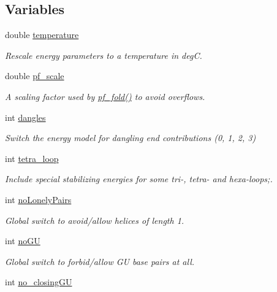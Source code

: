 \subsection*{Variables}
\begin{DoxyCompactItemize}
\item 
double \hyperlink{group__model__details_gab4b11c8d9c758430960896bc3fe82ead}{temperature}
\begin{DoxyCompactList}\small\item\em Rescale energy parameters to a temperature in degC. \end{DoxyCompactList}\item 
double \hyperlink{group__model__details_gad3b22044065acc6dee0af68931b52cfd}{pf\+\_\+scale}
\begin{DoxyCompactList}\small\item\em A scaling factor used by \hyperlink{group__pf__fold_gadc3db3d98742427e7001a7fd36ef28c2}{pf\+\_\+fold()} to avoid overflows. \end{DoxyCompactList}\item 
int \hyperlink{group__model__details_ga72b511ed1201f7e23ec437e468790d74}{dangles}
\begin{DoxyCompactList}\small\item\em Switch the energy model for dangling end contributions (0, 1, 2, 3) \end{DoxyCompactList}\item 
int \hyperlink{group__model__details_ga4f6265bdf0ead7ff4628a360adbfd77e}{tetra\+\_\+loop}
\begin{DoxyCompactList}\small\item\em Include special stabilizing energies for some tri-\/, tetra-\/ and hexa-\/loops;. \end{DoxyCompactList}\item 
int \hyperlink{group__model__details_ga097eccaabd6ae8b4fef83cccff85bb5d}{no\+Lonely\+Pairs}
\begin{DoxyCompactList}\small\item\em Global switch to avoid/allow helices of length 1. \end{DoxyCompactList}\item 
int \hyperlink{group__model__details_gabf380d09e4f1ab94fc6af57cf0ad5d32}{no\+GU}\hypertarget{group__model__details_gabf380d09e4f1ab94fc6af57cf0ad5d32}{}\label{group__model__details_gabf380d09e4f1ab94fc6af57cf0ad5d32}

\begin{DoxyCompactList}\small\item\em Global switch to forbid/allow GU base pairs at all. \end{DoxyCompactList}\item 
int \hyperlink{group__model__details_gaa8d1c7b92489179e1eafa562b7bdd259}{no\+\_\+closing\+GU}\hypertarget{group__model__details_gaa8d1c7b92489179e1eafa562b7bdd259}{}\label{group__model__details_gaa8d1c7b92489179e1eafa562b7bdd259}


\end{DoxyCompactItemize}
